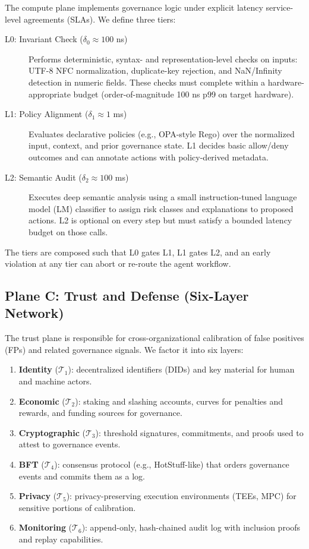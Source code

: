 \documentclass[11pt]{article}
\begin{document}
The compute plane implements governance logic under explicit latency service-level agreements (SLAs). We define three tiers:

\begin{description}
  \item[L0: Invariant Check (\( \delta_0 \approx 100\) ns)] Performs deterministic, syntax- and representation-level checks on inputs: UTF-8 NFC normalization, duplicate-key rejection, and NaN/Infinity detection in numeric fields. These checks must complete within a hardware-appropriate budget (order-of-magnitude 100 ns p99 on target hardware).
  \item[L1: Policy Alignment (\( \delta_1 \approx 1\) ms)] Evaluates declarative policies (e.g., OPA-style Rego) over the normalized input, context, and prior governance state. L1 decides basic allow/deny outcomes and can annotate actions with policy-derived metadata.
  \item[L2: Semantic Audit (\( \delta_2 \approx 100\) ms)] Executes deep semantic analysis using a small instruction-tuned language model (LM) classifier to assign risk classes and explanations to proposed actions. L2 is optional on every step but must satisfy a bounded latency budget on those calls.
\end{description}

The tiers are composed such that L0 gates L1, L1 gates L2, and an early violation at any tier can abort or re-route the agent workflow.

\subsection{Plane C: Trust and Defense (Six-Layer Network)}

The trust plane is responsible for cross-organizational calibration of false positives (FPs) and related governance signals. We factor it into six layers:

\begin{enumerate}[label=\arabic*.]
  \item \textbf{Identity} (\(\mathcal{T}_1\)): decentralized identifiers (DIDs) and key material for human and machine actors.
  \item \textbf{Economic} (\(\mathcal{T}_2\)): staking and slashing accounts, curves for penalties and rewards, and funding sources for governance.
  \item \textbf{Cryptographic} (\(\mathcal{T}_3\)): threshold signatures, commitments, and proofs used to attest to governance events.
  \item \textbf{BFT} (\(\mathcal{T}_4\)): consensus protocol (e.g., HotStuff-like) that orders governance events and commits them as a log.
  \item \textbf{Privacy} (\(\mathcal{T}_5\)): privacy-preserving execution environments (TEEs, MPC) for sensitive portions of calibration.
  \item \textbf{Monitoring} (\(\mathcal{T}_6\)): append-only, hash-chained audit log with inclusion proofs and replay capabilities.
\end{enumerate}
\end{document}
